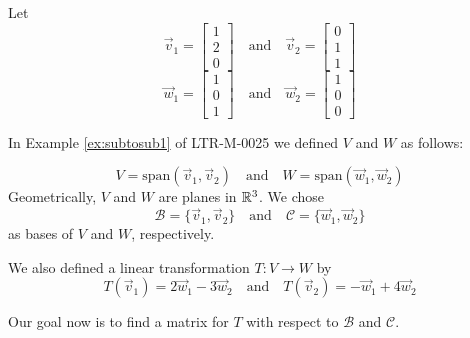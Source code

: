 \documentclass{ximera}
\begin{document}
\begin{exploration}\label{init:matlintransgeneral}
Let
$$\vec{v}_1=\begin{bmatrix}1\\2\\0\end{bmatrix}\quad\text{and}\quad\vec{v}_2=\begin{bmatrix}0\\1\\1\end{bmatrix}$$
$$\vec{w}_1=\begin{bmatrix}1\\0\\1\end{bmatrix}\quad\text{and}\quad\vec{w}_2=\begin{bmatrix}1\\0\\0\end{bmatrix}$$

In Example \ref{ex:subtosub1} of LTR-M-0025 we defined $V$ and $W$ as follows:

$$V=\text{span}(\vec{v}_1, \vec{v}_2)\quad\text{and}\quad W=\text{span}(\vec{w}_1, \vec{w}_2)$$
Geometrically, $V$ and $W$ are planes in $\mathbb{R}^3$.
We chose
$$\mathcal{B}=\{\vec{v}_1, \vec{v}_2\}\quad\text{and}\quad\mathcal{C}=\{\vec{w}_1, \vec{w}_2\}$$
as bases of $V$ and $W$, respectively.

We also defined a linear transformation $T:V\rightarrow W$ by 
$$T(\vec{v}_1)=2\vec{w}_1-3\vec{w}_2\quad\text{and} \quad T(\vec{v}_2)=-\vec{w}_1+4\vec{w}_2$$

Our goal now is to find a matrix for $T$ with respect to $\mathcal{B}$ and $\mathcal{C}$.  


\end{exploration}
\end{document}
